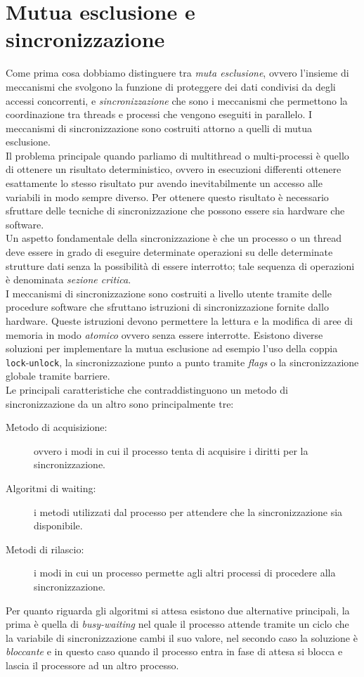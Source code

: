 \section{Mutua esclusione e sincronizzazione}\label{capitolo7}
Come prima cosa dobbiamo distinguere tra \emph{muta esclusione}, ovvero l'insieme di meccanismi che svolgono la funzione di proteggere dei dati condivisi da degli accessi concorrenti, e \emph{sincronizzazione} che sono i meccanismi che permettono la coordinazione tra threads e processi che vengono eseguiti in parallelo. I meccanismi di sincronizzazione sono costruiti attorno a quelli di mutua esclusione.\\
Il problema principale quando parliamo di multithread o multi-processi è quello di ottenere un risultato deterministico, ovvero in esecuzioni differenti ottenere esattamente lo stesso risultato pur avendo inevitabilmente un accesso alle variabili in modo sempre diverso. Per ottenere questo risultato è necessario sfruttare delle tecniche di sincronizzazione che possono essere sia hardware che software.\\
Un aspetto fondamentale della sincronizzazione è che un processo o un thread deve essere in grado di eseguire determinate operazioni su delle determinate strutture dati senza la possibilità di essere interrotto; tale sequenza di operazioni è denominata \emph{sezione critica}.\\
I meccanismi di sincronizzazione sono costruiti a livello utente tramite delle procedure software che sfruttano istruzioni di sincronizzazione fornite dallo hardware. Queste istruzioni devono permettere la lettura e la modifica di aree di memoria in modo \emph{atomico} ovvero senza essere interrotte. Esistono diverse soluzioni per implementare la mutua esclusione ad esempio l'uso della coppia \texttt{lock}-\texttt{unlock}, la sincronizzazione punto a punto tramite \emph{flags} o la sincronizzazione globale tramite barriere.\\
Le principali caratteristiche che contraddistinguono un metodo di sincronizzazione da un altro sono principalmente tre:
\begin{description}
\item[Metodo di acquisizione:] ovvero i modi in cui il processo tenta di acquisire i diritti per la sincronizzazione.
\item[Algoritmi di waiting:] i metodi utilizzati dal processo per attendere che la sincronizzazione sia disponibile.
\item[Metodi di rilascio:] i modi in cui un processo permette agli altri processi di procedere alla sincronizzazione.
\end{description}
Per quanto riguarda gli algoritmi si attesa esistono due alternative principali, la prima è quella di \emph{busy-waiting} nel quale il processo attende tramite un ciclo che la variabile di sincronizzazione cambi il suo valore, nel secondo caso la soluzione è \emph{bloccante} e in questo caso quando il processo entra in fase di attesa si blocca e lascia il processore ad un altro processo.
